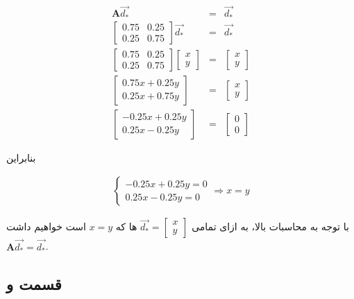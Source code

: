 \documentclass[14pt,a4]{article}
\begin{document}
\begin{eqnarray*}
    \textbf{A}\overrightarrow{d_*} & = & \overrightarrow{d_*}\\
    \begin{bmatrix}0.75 & 0.25\\ 0.25 & 0.75\end{bmatrix}\overrightarrow{d_*} & = & \overrightarrow{d_*} \\
    \begin{bmatrix}0.75 & 0.25\\ 0.25 & 0.75\end{bmatrix}\begin{bmatrix}x\\ y\end{bmatrix} & = & \begin{bmatrix}x\\ y\end{bmatrix} \\
    \begin{bmatrix}0.75x+0.25y\\ 0.25x+0.75y\end{bmatrix} & = & \begin{bmatrix}x\\ y\end{bmatrix} \\
    \begin{bmatrix}-0.25x+0.25y\\ 0.25x-0.25y\end{bmatrix} & = & \begin{bmatrix}0\\ 0\end{bmatrix}
\end{eqnarray*}

بنابراین

\begin{eqnarray*}
    \begin{cases} -0.25x+0.25y = 0 \\ 0.25x-0.25y = 0\end{cases} \Longrightarrow x = y
\end{eqnarray*}

با توجه به محاسبات بالا، به ازای تمامی $\overrightarrow{d_*}=\begin{bmatrix}x\\y\end{bmatrix}$
ها که $x=y$ است خواهیم داشت
\break
$\textbf{A}\overrightarrow{d_*} = \overrightarrow{d_*}$.

\subsection*{قسمت و}
\end{document}
